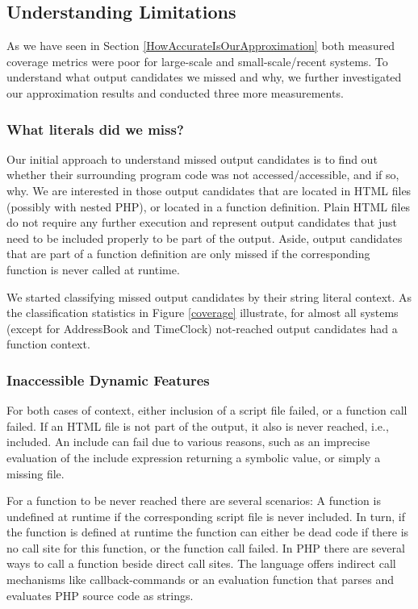 \documentclass[sigconf]{acmart}
\begin{document}
\subsection{Understanding Limitations} \label{sec:understanding_limitations}
As we have seen in Section \ref{HowAccurateIsOurApproximation} both measured
coverage metrics were poor for large-scale and small-scale/recent systems. To
understand what output candidates we missed and why, we further investigated
our approximation results and conducted three more measurements.

\subsubsection{What literals did we miss?}\label{WhatLiteralsDidWeMiss?}
Our initial approach to understand missed output candidates is to find out
whether their surrounding program code was not accessed/accessible, and if so,
why. We are interested in those output candidates that are located in HTML
files (possibly with nested PHP), or located in a function definition. Plain
HTML files do not require any further execution and represent output candidates
that just need to be included properly to be part of the output. Aside, output
candidates that are part of a function definition are only missed if the
corresponding function is never called at runtime.

We started classifying missed output candidates by their string literal
context. As the classification statistics in Figure \ref{coverage} illustrate,
for almost all systems (except for \textsf{AddressBook} and \textsf{TimeClock})
not-reached output candidates had a function context. 


\subsubsection{Inaccessible Dynamic Features}
\label{sec:inaccessible}
For both cases of context, either inclusion of a script file failed, or a
function call failed. If an HTML file is not part of the output, it also is
never reached, i.e., included. An include can fail due to various reasons, such
as an imprecise evaluation of the include expression returning a symbolic
value, or simply a missing file.

For a function to be never reached there are several scenarios: A function is
undefined at runtime if the corresponding script file is never included. In
turn, if the function is defined at runtime the function can either be dead
code if there is no call site for this function, or the function call failed.
In PHP there are several ways to call a function beside direct call sites. The
language offers indirect call mechanisms like callback-commands or an
evaluation function that parses and evaluates PHP source code as strings.
\end{document}
